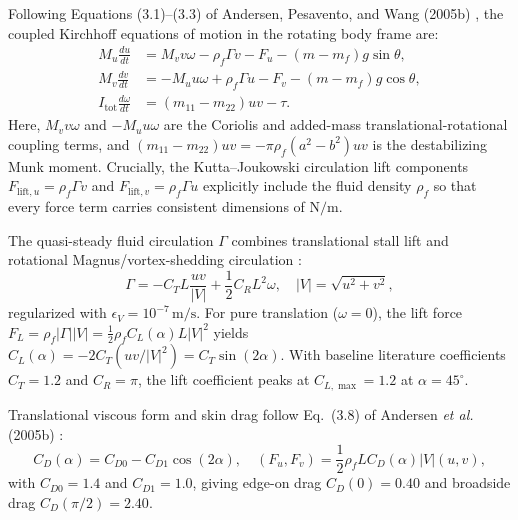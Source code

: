 \documentclass[10pt,a4paper,twocolumn]{article}
\begin{document}
Following Equations (3.1)--(3.3) of Andersen, Pesavento, and Wang (2005b) \cite{Andersen2005b}, the coupled Kirchhoff equations of motion in the rotating body frame are:
\begin{align}
    M_u \frac{du}{dt} &= M_v v \omega - \rho_f \Gamma v - F_u - (m - m_f) g \sin\theta, \label{eq:du} \\
    M_v \frac{dv}{dt} &= -M_u u \omega + \rho_f \Gamma u - F_v - (m - m_f) g \cos\theta, \label{eq:dv} \\
    I_{\mathrm{tot}} \frac{d\omega}{dt} &= (m_{11} - m_{22}) u v - \tau. \label{eq:dom}
\end{align}
Here, $M_v v\omega$ and $-M_u u\omega$ are the Coriolis and added-mass translational-rotational coupling terms, and $(m_{11} - m_{22})uv = -\pi\rho_f(a^2 - b^2)uv$ is the destabilizing Munk moment. Crucially, the Kutta--Joukowski circulation lift components $F_{\mathrm{lift},u} = \rho_f \Gamma v$ and $F_{\mathrm{lift},v} = \rho_f \Gamma u$ explicitly include the fluid density $\rho_f$ so that every force term carries consistent dimensions of $\mathrm{N/m}$.

The quasi-steady fluid circulation $\Gamma$ combines translational stall lift and rotational Magnus/vortex-shedding circulation \cite{Pesavento2004,Andersen2005b}:
\begin{equation}
    \Gamma = -C_T L \frac{u v}{|V|} + \frac{1}{2} C_R L^2 \omega, \quad |V| = \sqrt{u^2 + v^2}, \label{eq:gamma}
\end{equation}
regularized with $\epsilon_V = 10^{-7}\,\mathrm{m/s}$. For pure translation ($\omega = 0$), the lift force $F_L = \rho_f |\Gamma||V| = \frac{1}{2}\rho_f C_L(\alpha) L |V|^2$ yields $C_L(\alpha) = -2C_T(uv/|V|^2) = C_T \sin(2\alpha)$. With baseline literature coefficients $C_T = 1.2$ and $C_R = \pi$, the lift coefficient peaks at $C_{L,\max} = 1.2$ at $\alpha = 45^\circ$.

Translational viscous form and skin drag follow Eq.~(3.8) of Andersen \textit{et al.} (2005b) \cite{Andersen2005b}:
\begin{equation}
    C_D(\alpha) = C_{D0} - C_{D1}\cos(2\alpha), \quad (F_u, F_v) = \frac{1}{2}\rho_f L C_D(\alpha)|V|(u, v), \label{eq:drag}
\end{equation}
with $C_{D0} = 1.4$ and $C_{D1} = 1.0$, giving edge-on drag $C_D(0) = 0.40$ and broadside drag $C_D(\pi/2) = 2.40$.
\end{document}
